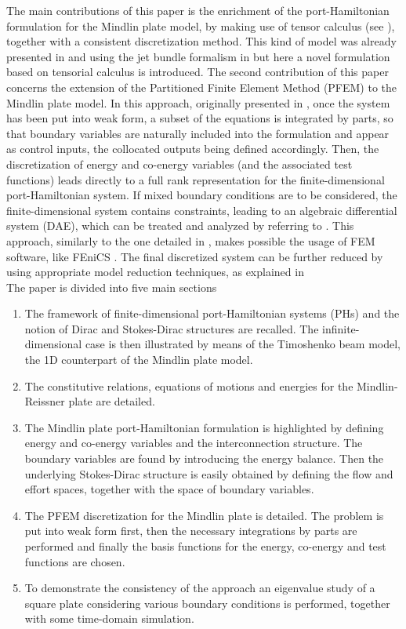 \documentclass[preprint,12pt]{elsarticle}
\newcommand{\firstReviewer}[1]{\textcolor{red!80!black}{#1}}
\newcommand{\secondReviewer}[1]{\textcolor{blue!80!black}{#1}}
\begin{document}
	The main contributions of this paper is the enrichment of the port-Hamiltonian formulation for the Mindlin plate model, by making use of tensor calculus (see \cite[Chapter~16]{Grinfield}), together with a consistent discretization method.  This kind of model was already presented in \cite{MacchelliMindlin} and \secondReviewer{using the jet bundle formalism in \cite{jetMin}} but here a novel formulation based on tensorial calculus is introduced.  The second contribution of this paper concerns the extension of the Partitioned Finite Element Method (PFEM) to the Mindlin plate model. In this approach, originally presented in \cite{CardosoRibeiro2018}, once the system has been put into weak form, a subset of the equations is integrated by parts, so that boundary variables are naturally included into the formulation and appear as control inputs, the collocated outputs being defined accordingly. Then, the discretization of energy and co-energy variables (and the associated test functions) leads directly to a full rank representation for the finite-dimensional port-Hamiltonian system. If mixed boundary conditions are to be considered, the finite-dimensional system contains constraints, leading to an algebraic differential system (DAE), which can be treated and analyzed by referring to \cite{vanderSchaft2013, beattie2018linear}. This approach, similarly to the one detailed in \cite{WeakForm_Kot}, makes possible the usage of FEM software, like FEniCS \cite{LoggMardalEtAl2012}. The final discretized system can be further reduced by using appropriate model reduction techniques, as explained in \cite{TONG20132727, Mehrmann2018}  \\
	
	The paper is divided into \firstReviewer{five} main sections 
	\begin{enumerate}
		\item The framework of finite-dimensional port-Hamiltonian systems (PHs) and the notion of Dirac and Stokes-Dirac structures are recalled. The infinite-dimensional case is then illustrated by means of the Timoshenko beam model, the 1D counterpart of the Mindlin plate model.
		\item \secondReviewer{The constitutive relations, equations of motions and energies for the Mindlin-Reissner plate are detailed.}
		\item The Mindlin plate port-Hamiltonian formulation is highlighted by defining energy and co-energy variables and the interconnection structure. The boundary variables are found by introducing the energy balance. Then the underlying Stokes-Dirac structure is easily obtained by defining the flow and effort spaces, together with the space of boundary variables.
		\item The PFEM discretization for the Mindlin plate is detailed. The problem is put into weak form first, then the necessary integrations by parts are performed and finally the basis functions for the energy, co-energy and test functions are chosen.
		\item \firstReviewer{To demonstrate the consistency of the approach an eigenvalue study of a square plate considering various boundary conditions is performed, together with some time-domain simulation.} 
	\end{enumerate}
\end{document}
